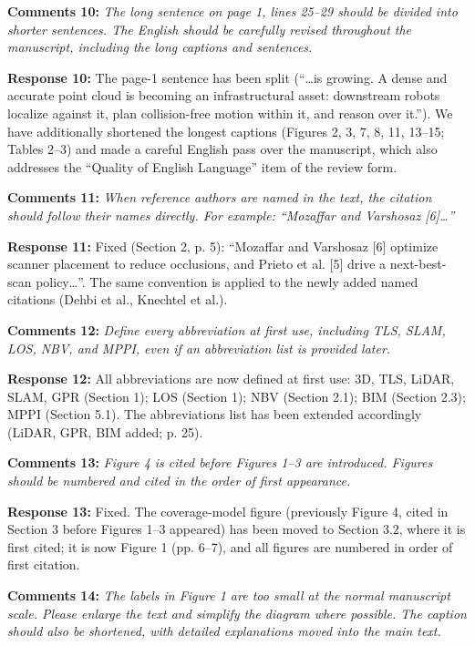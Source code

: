\documentclass[11pt]{article}
\begin{document}
\medskip

\textbf{Comments 10:} \emph{The long sentence on page 1, lines 25–29 should be divided into shorter sentences. The English should be carefully revised throughout the manuscript, including the long captions and sentences.}

\textbf{Response 10:} The page-1 sentence has been split (“…is growing. A dense and accurate point cloud is becoming an infrastructural asset: downstream robots localize against it, plan collision-free motion within it, and reason over it.”). We have additionally shortened the longest captions (Figures 2, 3, 7, 8, 11, 13–15; Tables 2–3) and made a careful English pass over the manuscript, which also addresses the “Quality of English Language” item of the review form.

\medskip

\textbf{Comments 11:} \emph{When reference authors are named in the text, the citation should follow their names directly. For example: “Mozaffar and Varshosaz [6]…”}

\textbf{Response 11:} Fixed (Section 2, p. 5): “Mozaffar and Varshosaz [6] optimize scanner placement to reduce occlusions, and Prieto et al. [5] drive a next-best-scan policy…”. The same convention is applied to the newly added named citations (Dehbi et al., Knechtel et al.).

\medskip

\textbf{Comments 12:} \emph{Define every abbreviation at first use, including TLS, SLAM, LOS, NBV, and MPPI, even if an abbreviation list is provided later.}

\textbf{Response 12:} All abbreviations are now defined at first use: 3D, TLS, LiDAR, SLAM, GPR (Section 1); LOS (Section 1); NBV (Section 2.1); BIM (Section 2.3); MPPI (Section 5.1). The abbreviations list has been extended accordingly (LiDAR, GPR, BIM added; p. 25).

\medskip

\textbf{Comments 13:} \emph{Figure 4 is cited before Figures 1–3 are introduced. Figures should be numbered and cited in the order of first appearance.}

\textbf{Response 13:} Fixed. The coverage-model figure (previously Figure 4, cited in Section 3 before Figures 1–3 appeared) has been moved to Section 3.2, where it is first cited; it is now Figure 1 (pp. 6–7), and all figures are numbered in order of first citation.

\medskip

\textbf{Comments 14:} \emph{The labels in Figure 1 are too small at the normal manuscript scale. Please enlarge the text and simplify the diagram where possible. The caption should also be shortened, with detailed explanations moved into the main text.}
\end{document}
